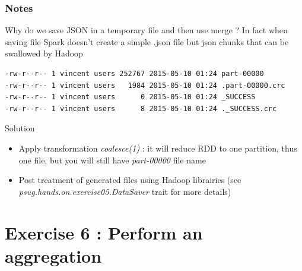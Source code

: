 \documentclass[slidetop,9pt,utf8]{beamer}
\begin{document}
\begin{frame}[fragile]
  \frametitle{Notes}

  \begin{exampleblock}{Why do we save JSON in a temporary file and then use merge ?}
    In fact when saving file Spark doesn't create a simple .json file but json chunks that can be swallowed by Hadoop
  \end{exampleblock}

  \begin{lstlisting}[label=contentOfTemporaryFile, caption=Content of Temporary File, language=bash, style=terminal]
-rw-r--r-- 1 vincent users 252767 2015-05-10 01:24 part-00000
-rw-r--r-- 1 vincent users   1984 2015-05-10 01:24 .part-00000.crc
-rw-r--r-- 1 vincent users      0 2015-05-10 01:24 _SUCCESS
-rw-r--r-- 1 vincent users      8 2015-05-10 01:24 ._SUCCESS.crc
  \end{lstlisting}

  \begin{exampleblock}{Solution}
    \begin{itemize}
      \item Apply transformation \textit{coalesce(1)} : it will reduce RDD to one partition, thus one file, but you will still have \textit{part-00000} file name
      \item Post treatment of generated files using Hadoop librairies (see \textit{psug.hands.on.exercise05.DataSaver} trait for more details)
    \end{itemize}
  \end{exampleblock}

\end{frame}

%
%
%
%

\section{Exercise 6 : Perform an aggregation}
\end{document}
